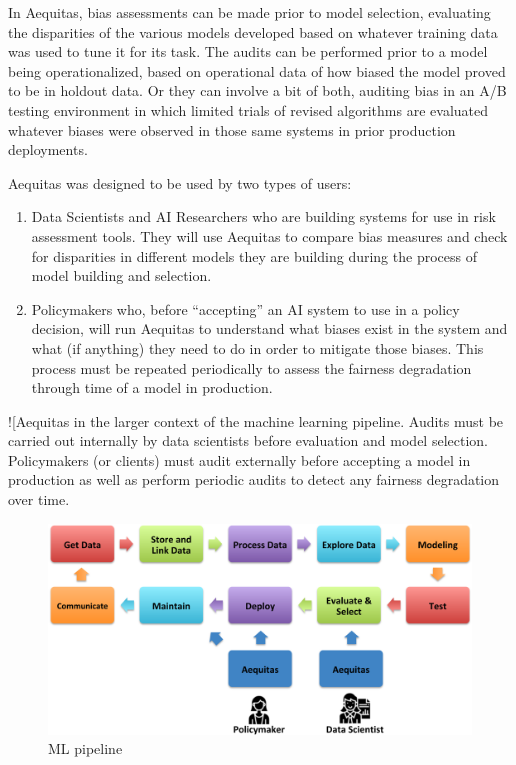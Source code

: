 \documentclass[]{krantz}
\begin{document}
In Aequitas, bias assessments can be made prior to model selection,
evaluating the disparities of the various models developed based on
whatever training data was used to tune it for its task. The audits can
be performed prior to a model being operationalized, based on
operational data of how biased the model proved to be in holdout data.
Or they can involve a bit of both, auditing bias in an A/B testing
environment in which limited trials of revised algorithms are evaluated
whatever biases were observed in those same systems in prior production
deployments.

Aequitas was designed to be used by two types of users:

\begin{enumerate}
\def\labelenumi{\arabic{enumi}.}
\item
  Data Scientists and AI Researchers who are building systems for use in
  risk assessment tools. They will use Aequitas to compare bias measures
  and check for disparities in different models they are building during
  the process of model building and selection.
\item
  Policymakers who, before ``accepting'' an AI system to use in a policy
  decision, will run Aequitas to understand what biases exist in the
  system and what (if anything) they need to do in order to mitigate
  those biases. This process must be repeated periodically to assess the
  fairness degradation through time of a model in production.
\end{enumerate}

!{[}Aequitas in the larger context of the machine learning pipeline.
Audits must be carried out internally by data scientists before
evaluation and model selection. Policymakers (or clients) must audit
externally before accepting a model in production as well as perform
periodic audits to detect any fairness degradation over time.

\begin{figure}

{\centering \includegraphics[width=0.8\linewidth]{ChapterBias/figures/audit_pipeline} 

}

\caption{ML pipeline}\label{fig:ml-pipeline}
\end{figure}
\end{document}
